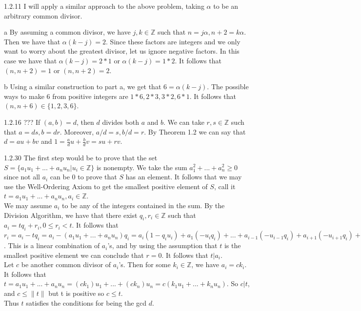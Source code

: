 \documentclass[12pt]{article}
\begin{document}
\begin{section}{1.2.11}
	I will apply a similar approach to the above problem, taking $\alpha$ to be an arbitrary common divisor.
	\begin{subsection}{a}
		By assuming a common divisor, we have $j, k \in \mathbb{Z}$ such that $n = j \alpha, n + 2 = k \alpha$.  Then we have that $\alpha (k - j) = 2$.  Since these factors are integers and we only want to worry about the greatest divisor, let us ignore negative factors.  In this case we have that $\alpha (k-j) = 2 * 1$ or $ \alpha (k - j) = 1 *2.$  It follows that $(n, n+2) = 1$ or $(n, n +2) = 2$.
	\end{subsection}
\begin{subsection}{b}
	Using a similar construction to part a, we get that $6 = \alpha (k - j).$  The possible ways to make $6$ from positive integers are $1*6, 2*3, 3*2, 6*1$.  It follows that $(n, n+6) \in \{1, 2, 3, 6\}$.
\end{subsection}
\end{section}
\begin{section}{1.2.16 ???}
	If $(a,b) = d$, then $d$ divides both $a$ and $b$.  We can take $r, s \in \mathbb{Z}$ such that $a = ds, b=dr.$  Moreover, $a/d = s, b/d =r$.  By Theorem 1.2 we can say that $d = au + bv$ and $1 = \frac{a}{d}u + \frac{b}{d}v = su + rv$.
\end{section}
\begin{section}{1.2.30}
	The first step would be to prove that the set $S = \{a_1u_1 + ... + a_nu_n \vert u_i \in \mathbb{Z}\}$ is nonempty.  We take the sum $a_1^2 + ... + a_n^2 \geq 0$ since not all $a_i$ can be $0$ to prove that $S$ has an element.  It follows that we may use the Well-Ordering Axiom to get the smallest positive element of $S$, call it $t = a_1u_1 + ... + a_nu_n, a_i \in \mathbb{Z}$.  \\
	We may assume $a_i$ to be any of the integers contained in the sum.  By the Division Algorithm, we have that there exist $q_i, r_i \in \mathbb{Z}$ such that $a_i = tq_i + r_i , 0 \leq r_i < t$.  It follows that $r_i = a_i - tq_i = a_i - (a_1u_1 + ... + a_nu_n)q_i = a_i(1 - q_iu_i) + a_1(-u_iq_i) + ... + a_{i-1}(-u_{i-1}q_i) + a_{i + 1}(-u_{i+1}q_i) + ...  + a_n(-u_nq_i)$.  This is a linear combination of $a_i$'s, and by using the assumption that $t$ is the smallest positive element we can conclude that $r = 0$.  It follows that $t \vert a_i$.\\
	Let $c$ be another common divisor of $a_i$'s.  Then for some $k_i \in \mathbb{Z}$, we have $a_i = ck_i$.  It follows that $t = a_1u_1 + ... + a_nu_n = (ck_1)u_1 + ... + (ck_n)u_n = c(k_1u_1 + ... + k_nu_n)$.  So $c \vert t$, and $c \leq \|t\|$ but t is positive so $c \leq t$.\\
	Thus $t$ satisfies the conditions for being the gcd $d$.
\end{section}
\end{document}
